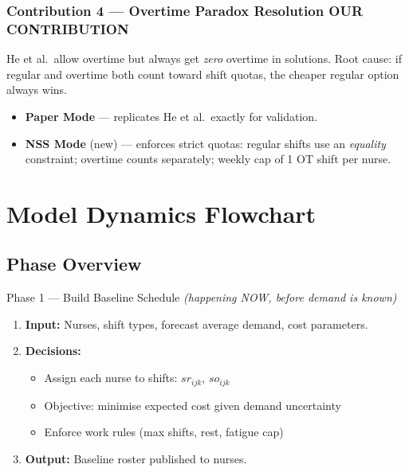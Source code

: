 \documentclass[12pt,a4paper]{article}
\newcommand{\contribbadge}{\colorbox{accentred}{\tiny\color{white}\textbf{OUR CONTRIBUTION}}\,}
\begin{document}
\newpage
\subsubsection{Contribution 4 — Overtime Paradox Resolution \contribbadge}

\begin{problembox}[Issue in He et al., 2019]
He et al.\ allow overtime but always get \emph{zero} overtime in solutions. Root cause: if regular and overtime both count toward shift quotas, the cheaper regular option always wins.
\end{problembox}

\begin{contribbox}
\begin{itemize}[itemsep=2pt]
  \item \textbf{Paper Mode} — replicates He et al.\ exactly for validation.
  \item \textbf{NSS Mode} (new) — enforces strict quotas: regular shifts use an \emph{equality} constraint; overtime counts separately; weekly cap of 1 OT shift per nurse.
\end{itemize}
\end{contribbox}

\newpage
\section{Model Dynamics Flowchart}

\subsection{Phase Overview}

\begin{phasebox}[royalblue]{Phase 1 — Build Baseline Schedule \hfill\textit{(happening NOW, before demand is known)}}
\begin{enumerate}[itemsep=3pt]
  \item \textbf{Input:} Nurses, shift types, forecast average demand, cost parameters.
  \item \textbf{Decisions:}
    \begin{itemize}
      \item Assign each nurse to shifts: $sr_{ijk}$, $so_{ijk}$
      \item Objective: minimise expected cost given demand uncertainty
      \item Enforce work rules (max shifts, rest, fatigue cap)
    \end{itemize}
  \item \textbf{Output:} Baseline roster published to nurses.
\end{enumerate}
\end{phasebox}
\end{document}
